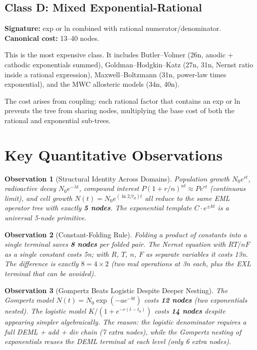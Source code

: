 \documentclass[12pt,a4paper]{article}
\newtheorem{observation}{Observation}[section]
\theoremstyle{definition}
\begin{document}
\subsection{Class D: Mixed Exponential-Rational}

\textbf{Signature:} exp or ln combined with rational numerator/denominator.
\textbf{Canonical cost:} 13--40 nodes.

This is the most expensive class.  It includes Butler--Volmer (26n,
anodic + cathodic exponentials summed), Goldman--Hodgkin--Katz (27n, 31n,
Nernst ratio inside a rational expression), Maxwell--Boltzmann (31n,
power-law times exponential), and the MWC allosteric models (34n, 40n).

The cost arises from coupling: each rational factor that contains an exp
or ln prevents the tree from sharing nodes, multiplying the base cost
of both the rational and exponential sub-trees.

\section{Key Quantitative Observations}
\label{sec:observations}

\begin{observation}[Structural Identity Across Domains]
\label{obs:identity}
Population growth $N_0 e^{rt}$, radioactive decay $N_0 e^{-\lambda t}$,
compound interest $P(1+r/n)^{nt} \approx P e^{rt}$ (continuous limit),
and cell growth $N(t) = N_0 e^{(\ln 2/t_d)t}$ all reduce to the same
EML operator tree with exactly \textbf{5 nodes}.  The exponential template
$C \cdot e^{\pm kt}$ is a universal 5-node primitive.
\end{observation}

\begin{observation}[Constant-Folding Rule]
\label{obs:folding}
Folding a product of constants into a single terminal saves \textbf{8 nodes}
per folded pair.  The Nernst equation with $RT/nF$ as a single constant
costs 5n; with $R$, $T$, $n$, $F$ as separate variables it costs 13n.
The difference is exactly $8 = 4 \times 2$ (two mul operations at 3n each,
plus the EXL terminal that can be avoided).
\end{observation}

\begin{observation}[Gompertz Beats Logistic Despite Deeper Nesting]
\label{obs:gompertz}
The Gompertz model $N(t) = N_0 \exp(-ae^{-bt})$ costs \textbf{12 nodes}
(two exponentials nested).  The logistic model $K/(1+e^{-r(t-t_0)})$
costs \textbf{14 nodes} despite appearing simpler algebraically.
The reason: the logistic denominator requires a full DEML + add + div
chain (7 extra nodes), while the Gompertz nesting of exponentials
reuses the DEML terminal at each level (only 6 extra nodes).
\end{observation}
\end{document}
